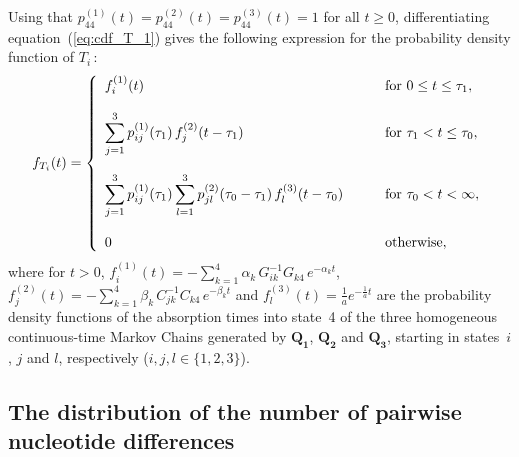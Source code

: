\documentclass[11pt]{article}
\begin{document}
Using that $p^{(1)}_{44}(t)=p^{(2)}_{44}(t)=p^{(3)}_{44}(t)=1$ for all $t \geq 0$, differentiating equation~(\ref{eq:cdf_T_1}) gives the following expression for the probability density function of $T_{i}\,$:
\begin{equation}
\label{eq:pdf_T_1}
f_{T_{i}}(t) = \left\{
  \begin{array}{l l}
   f^{(1)}_{i}(t) & \quad \text{for }0 \leq t \leq \tau_{1},\\
   \\
    \displaystyle\sum_{j=1}^{3}p^{(1)}_{ij}(\tau_{1})\,f^{(2)}_{j}(t-\tau_{1}) \quad  & \quad \text{for }\tau_{1} < t \leq \tau_{0},\\
    \\
 \displaystyle\sum_{j=1}^{3} p^{(1)}_{ij}(\tau_{1})\displaystyle\sum_{l=1}^{3}p^{(2)}_{jl}(\tau_{0}-\tau_{1})\,f^{(3)}_{l}(t-\tau_{0}) \quad& \quad \text{for } \tau_{0} < t< \infty,\\
   \\
0\quad &\quad \text{otherwise},
  \end{array} \right.
\end{equation}
where for $t>0$, $f^{(1)}_{i}(t)= -\sum_{k=1}^{4} \alpha_{k}\,G_{ik}^{-1}G_{k4}\,e^{-\alpha_{k}t}$, $f^{(2)}_{j}(t)= -\sum_{k=1}^{4} \beta_{k}\, C_{jk}^{-1}C_{k4}\,e^{-\beta_{k}t}$ and  $f^{(3)}_{l}(t)=
\frac{1}{a} e^{-\frac{1}{a}t}$
are the probability density functions of the absorption times into state~4 of the three homogeneous continuous-time Markov Chains generated by $\mathbf{Q_{1}}$, $\mathbf{Q_{2}}$ and $\mathbf{Q_{3}}$, starting in states~$i$, $j$ and $l$, respectively ($i,j,l \in \{1,2,3\}$).



\subsection{The distribution of the number of pairwise nucleotide differences}
\end{document}
